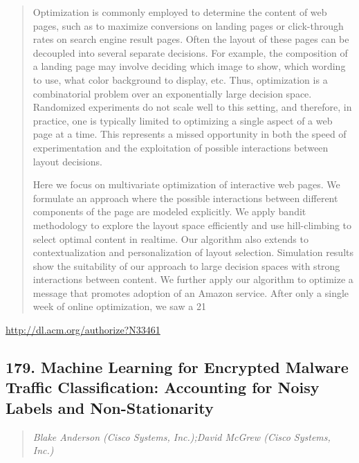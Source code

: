 \documentclass{article}
\begin{document}
\begin{quote}
Optimization is commonly employed to determine the content of web pages, such as to maximize conversions on landing pages or click-through rates on search engine result pages. Often the layout of these pages can be decoupled into several separate decisions. For example, the composition of a landing page may involve deciding which image to show, which wording to use, what color background to display, etc. Thus, optimization is a combinatorial problem over an exponentially large decision space. Randomized experiments do not scale well to this setting, and therefore, in practice, one is typically limited to optimizing a single aspect of a web page at a time. This represents a missed opportunity in both the speed of experimentation and the exploitation of possible interactions between layout decisions.







  Here we focus on multivariate optimization of interactive web pages. We formulate an approach where the possible interactions between different components of the page are modeled explicitly. We apply bandit methodology to explore the layout space efficiently and use hill-climbing to select optimal content in realtime. Our algorithm also extends to contextualization and personalization of layout selection. Simulation results show the suitability of our approach to large decision spaces with strong interactions between content. We further apply our algorithm to optimize a message that promotes adoption of an Amazon service. After only a single week of online optimization, we saw a 21%
\end{quote}

\href{http://dl.acm.org/authorize?N33461}{http://dl.acm.org/authorize?N33461}

\subsection{179. Machine Learning for Encrypted Malware Traffic Classification: Accounting for Noisy Labels and Non-Stationarity}

\begin{quote}
\footnotesize{\textit{Blake Anderson (Cisco Systems, Inc.);David McGrew (Cisco Systems, Inc.)}}

\end{quote}
\end{document}
